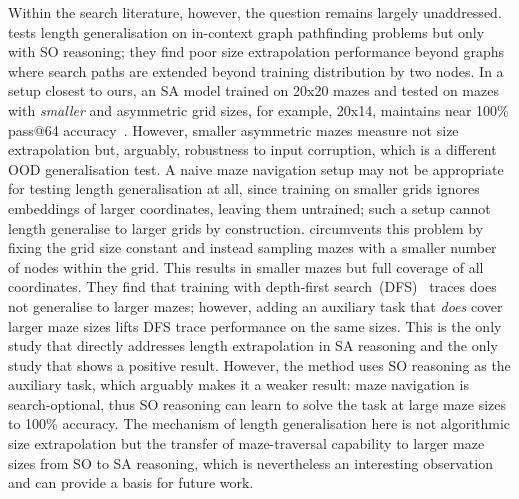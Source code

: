 Within the search literature, however, the question remains largely unaddressed.
\citet{saparovTransformersStruggleLearn2025} tests length generalisation on in-context graph pathfinding problems but only with SO reasoning; they find poor size extrapolation performance beyond graphs where search paths are extended beyond training distribution by two nodes.
In a setup closest to ours, an SA model trained on 20x20 mazes and tested on mazes with \textit{smaller} and asymmetric grid sizes, for example, 20x14, maintains near 100\% pass@64 accuracy~\citep{suDualformerControllableFast2025}.
However, smaller asymmetric mazes measure not size extrapolation but, arguably, robustness to input corruption, which is a different OOD generalisation test.
A naive maze navigation setup may not be appropriate for testing length generalisation at all, since training on smaller grids ignores embeddings of larger coordinates, leaving them untrained; such a setup cannot length generalise to larger grids by construction.
\citet{caiExtrapolationAssociationLength2025} circumvents this problem by fixing the grid size constant and instead sampling mazes with a smaller number of nodes within the grid.
This results in smaller mazes but full coverage of all coordinates.
They find that training with depth-first search~(DFS)~\citep{russel2010} traces does not generalise to larger mazes; however, adding an auxiliary task that \textit{does} cover larger maze sizes lifts DFS trace performance on the same sizes.
This is the only study that directly addresses length extrapolation in SA reasoning and the only study that shows a positive result.
However, the method uses SO reasoning as the auxiliary task, which arguably makes it a weaker result: maze navigation is search-optional, thus SO reasoning can learn to solve the task at large maze sizes to 100\% accuracy.
The mechanism of length generalisation here is not algorithmic size extrapolation but the transfer of maze-traversal capability to larger maze sizes from SO to SA reasoning, which is nevertheless an interesting observation and can provide a basis for future work.

